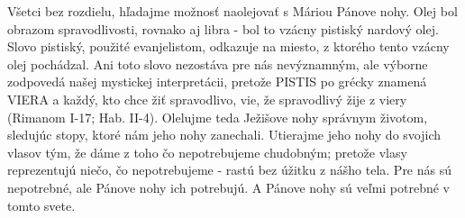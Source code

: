 Všetci bez rozdielu, hľadajme možnosť naolejovať s Máriou Pánove nohy. Olej bol obrazom spravodlivosti, rovnako aj libra - bol to vzácny pistiský nardový olej. Slovo pistiský, použité evanjelistom, odkazuje na miesto, z ktorého tento vzácny olej pochádzal. Ani toto slovo nezostáva pre nás nevýznamným, ale výborne zodpovedá našej mystickej interpretácii, pretože PISTIS po grécky znamená VIERA a každý, kto chce žiť spravodlivo, vie, že spravodlivý žije z viery (Rimanom I-17; Hab. II-4). Olelujme teda Ježišove nohy správnym životom, sledujúc stopy, ktoré nám jeho nohy zanechali. Utierajme jeho nohy do svojich vlasov tým, že dáme z toho čo nepotrebujeme chudobným; pretože vlasy reprezentujú niečo, čo nepotrebujeme - rastú bez úžitku z nášho tela. Pre nás sú nepotrebné, ale Pánove nohy ich potrebujú. A Pánove nohy sú veľmi potrebné v tomto svete.
